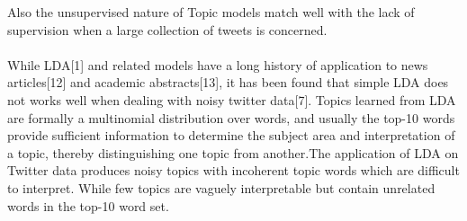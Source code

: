 \documentclass[10pt,a5paper,twoside]{article}
\begin{document}
Also the unsupervised nature of Topic models match well with the lack of supervision when a large collection of tweets is concerned.
\\\\
While LDA[1] and related models have a long history of application to news articles[12] and academic abstracts[13], it has been found that simple LDA does not works well when dealing with noisy twitter data[7]. Topics learned from LDA are formally a multinomial distribution over words, and usually the top-10 words provide sufficient information to determine the subject area and interpretation of a topic, thereby distinguishing one topic from another.The application of LDA on Twitter data produces noisy topics with incoherent topic words which are difficult to interpret. While few topics are vaguely interpretable but contain unrelated words in the top-10 word set.

\end{document}
